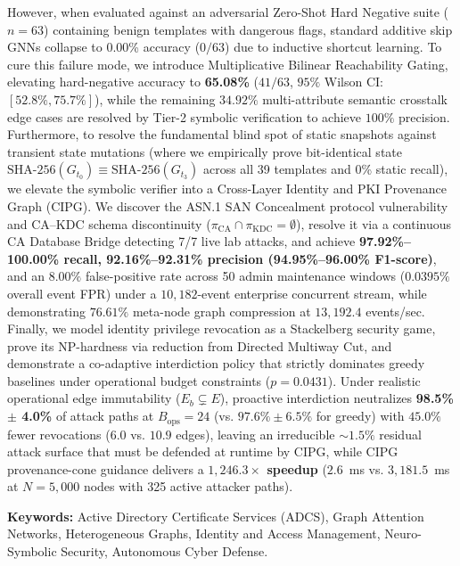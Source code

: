 However, when evaluated against an adversarial Zero-Shot Hard Negative suite ($n = 63$) containing benign templates with dangerous flags, standard additive skip GNNs collapse to 0.00\% accuracy ($0/63$) due to inductive shortcut learning. To cure this failure mode, we introduce Multiplicative Bilinear Reachability Gating, elevating hard-negative accuracy to \textbf{65.08\%} ($41/63$, $95\%$ Wilson CI: $[52.8\%, 75.7\%]$), while the remaining $34.92\%$ multi-attribute semantic crosstalk edge cases are resolved by Tier-2 symbolic verification to achieve $100\%$ precision. Furthermore, to resolve the fundamental blind spot of static snapshots against transient state mutations (where we empirically prove bit-identical state $\text{SHA-256}(G_{t_0}) \equiv \text{SHA-256}(G_{t_3})$ across all 39 templates and 0\% static recall), we elevate the symbolic verifier into a Cross-Layer Identity and PKI Provenance Graph (CIPG). We discover the ASN.1 SAN Concealment protocol vulnerability and CA--KDC schema discontinuity ($\pi_{\text{CA}} \cap \pi_{\text{KDC}} = \emptyset$), resolve it via a continuous CA Database Bridge detecting 7/7 live lab attacks, and achieve \textbf{97.92\%--100.00\% recall, 92.16\%--92.31\% precision (94.95\%--96.00\% F1-score)}, and an $8.00\%$ false-positive rate across 50 admin maintenance windows ($0.0395\%$ overall event FPR) under a $10,182$-event enterprise concurrent stream, while demonstrating $76.61\%$ meta-node graph compression at $13,192.4$ events/sec. Finally, we model identity privilege revocation as a Stackelberg security game, prove its NP-hardness via reduction from Directed Multiway Cut, and demonstrate a co-adaptive interdiction policy that strictly dominates greedy baselines under operational budget constraints ($p = 0.0431$). Under realistic operational edge immutability ($E_b \subsetneq E$), proactive interdiction neutralizes \textbf{98.5\% $\pm$ 4.0\%} of attack paths at $B_{\text{ops}}=24$ (vs. $97.6\% \pm 6.5\%$ for greedy) with $45.0\%$ fewer revocations ($6.0$ vs. $10.9$ edges), leaving an irreducible $\sim 1.5\%$ residual attack surface that must be defended at runtime by CIPG, while CIPG provenance-cone guidance delivers a \textbf{$1,246.3\times$ speedup} ($2.6$~ms vs. $3,181.5$~ms at $N=5,000$ nodes with 325 active attacker paths).

\vspace{0.4cm}
\noindent\textbf{Keywords:} Active Directory Certificate Services (ADCS), Graph Attention Networks, Heterogeneous Graphs, Identity and Access Management, Neuro-Symbolic Security, Autonomous Cyber Defense.

